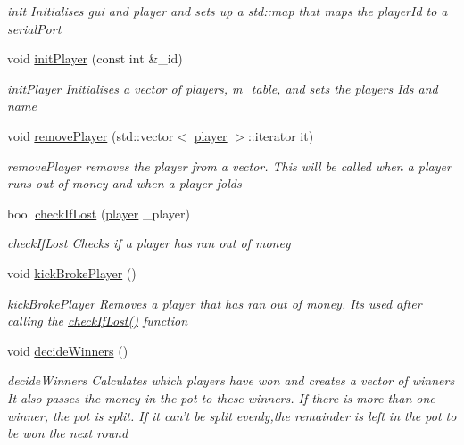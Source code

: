 \begin{DoxyCompactItemize}
\begin{DoxyCompactList}\small\item\em init Initialises gui and player and sets up a std\-::map that maps the player\-Id to a serial\-Port \end{DoxyCompactList}\item 
void \hyperlink{classdealerLib_a6947167bb1dd66d30786cf6b5a98f96d}{init\-Player} (const int \&\-\_\-id)
\begin{DoxyCompactList}\small\item\em init\-Player Initialises a vector of players, m\-\_\-table, and sets the players Ids and name \end{DoxyCompactList}\item 
void \hyperlink{classdealerLib_acb8f77a5e89baa3a270eef4583174c05}{remove\-Player} (std\-::vector$<$ \hyperlink{classplayer}{player} $>$\-::iterator it)
\begin{DoxyCompactList}\small\item\em remove\-Player removes the player from a vector. This will be called when a player runs out of money and when a player folds \end{DoxyCompactList}\item 
bool \hyperlink{classdealerLib_a3949e823778c930990f40ebc453429ed}{check\-If\-Lost} (\hyperlink{classplayer}{player} \-\_\-player)
\begin{DoxyCompactList}\small\item\em check\-If\-Lost Checks if a player has ran out of money \end{DoxyCompactList}\item 
void \hyperlink{classdealerLib_ac9ce461a32b7312615d47be5e5c8cb5a}{kick\-Broke\-Player} ()
\begin{DoxyCompactList}\small\item\em kick\-Broke\-Player Removes a player that has ran out of money. Its used after calling the \hyperlink{classdealerLib_a3949e823778c930990f40ebc453429ed}{check\-If\-Lost()} function \end{DoxyCompactList}\item 
void \hyperlink{classdealerLib_af172da91f337b8fdc9b60a6463f4ff21}{decide\-Winners} ()
\begin{DoxyCompactList}\small\item\em decide\-Winners Calculates which players have won and creates a vector of winners It also passes the money in the pot to these winners. If there is more than one winner, the pot is split. If it can't be split evenly,the remainder is left in the pot to be won the next round \end{DoxyCompactList}\item 

\end{DoxyCompactItemize}
